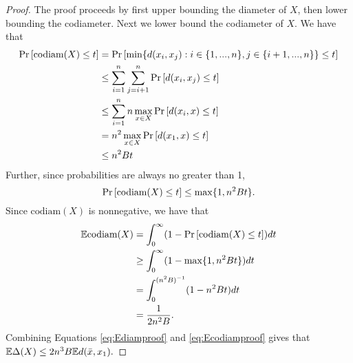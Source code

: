 \documentclass[../main.tex]{subfiles}
\newcommand{\dist}[2]{\distf({#1},{#2})}
\newcommand{\distf}{d}
\newcommand{\diam}[1]{\text{diam}({#1})}
\newcommand{\codiam}[1]{\text{codiam}({#1})}
\newcommand{\aspect}[1]{\Delta({#1})}
\begin{document}
\begin{proof}
    The proof proceeds by first upper bounding the diameter of $X$,
    then lower bounding the codiameter.
    Next we lower bound the codiameter of $X$.
    We have that
    \begin{align}
        \prob{\codiam{X} \le t}
        &=
        \prob{\min \{ \dist{x_i}{x_j} : i\in\{1,...,n\}, j\in\{i+1,...,n\} \} \le t}
        \\ &\le 
        \sum_{i=1}^n\sum_{j=i+1}^n \prob{\dist{x_i}{x_j} \le t}
        \\ &\le
        \sum_{i=1}^n n \max_{x\in X} \prob{\dist{x_i}{x} \le t}
        \\ & =
        n^2 \max_{x\in X} \prob{\dist{x_1}{x} \le t}
        \\ & \le 
        n^2 B t
    \end{align}
    Further, since probabilities are always no greater than 1,
    \begin{equation}
        \prob{\codiam{X}\le t} \le \max\{1,n^2Bt\}
        .
    \end{equation}
    Since $\codiam{X}$ is nonnegative, we have that 
    \begin{align}
        \E \codiam{X}
        &=
        \int_0^\infty (1-\prob{\codiam{X} \le t}) dt
        \\ & \ge
        \int_0^\infty (1-\max\{1,n^2 Bt\})dt
        \\ & = 
        \int_0^{(n^2B)^{-1}} (1 - n^2 Bt) dt
        \\ & =
        \frac{1}{2n^2B}
        \label{eq:Ecodiamproof}
        .
    \end{align}
    Combining Equations \eqref{eq:Ediamproof} and \eqref{eq:Ecodiamproof} gives that $\E\aspect{X} \le 2n^3B\E\dist{\bar x}{x_1}.$
\end{proof}
\end{document}
